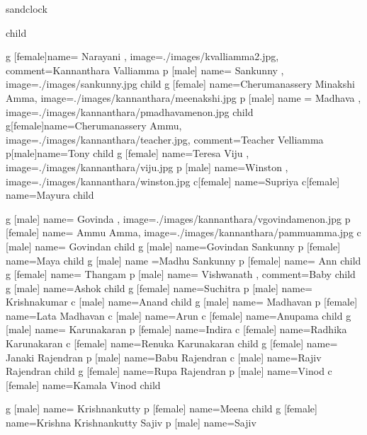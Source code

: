 \documentclass{article}
\begin{document}
\begin{landscape}
\begin{genealogypicture}
sandclock {
	child {
  		g [female]{name={ Narayani }, image={./images/kvalliamma2.jpg}, comment={Kannanthara Valliamma}}
   		p [male] {name={ Sankunny }, image={./images/sankunny.jpg}}
		child {
			g [female] {name={Cherumanassery Minakshi Amma}, image={./images/kannanthara/meenakshi.jpg}}
			p [male] {name ={ Madhava }, image={./images/kannanthara/pmadhavamenon.jpg}}
		}
		child {
  			g[female]{name=Cherumanassery Ammu, image={./images/kannanthara/teacher.jpg}, comment={Teacher Velliamma}}
   			p[male]{name={Tony }}
   			child {
    				g [female] {name=Teresa Viju , image={./images/kannanthara/viju.jpg}}
    				p [male] {name=Winston , image={./images/kannanthara/winston.jpg}}
				c[female] {name={Supriya }}
				c[female] {name={Mayura }}
   			}
  		}
		child {
			g [male] {name={ Govinda }, image={./images/kannanthara/vgovindamenon.jpg}}
			p [female] {name={ Ammu Amma}, image={./images/kannanthara/pammuamma.jpg}}
			c [male] {name={ Govindan }}
			child {
				g [male] {name={Govindan Sankunny}}
				p [female] {name=Maya}
				child {
					g [male] {name ={Madhu Sankunny}}
					p [female] {name={ Ann}}
				}
			}
			child {
				g [female] {name={ Thangam }}
				p [male] {name={ Vishwanath }, comment={Baby}}
				child {
					g [male] {name={Ashok }}
				}
				child {
					g [female] {name={Suchitra }}
					p [male] {name={ Krishnakumar}}
				}
				c [male] {name={Anand }}
			}
			child {
				g [male] {name={ Madhavan}}
				p [female] {name={Lata Madhavan }}
				c [male] {name={Arun }}
				c [female] {name={Anupama }}
			}
			child {
				g [male] {name={ Karunakaran}}
				p [female] {name=Indira}
				c [female] {name={Radhika Karunakaran}}
				c [female] {name={Renuka Karunakaran}}
			}
			child {
				g [female] {name={ Janaki Rajendran}}
				p [male] {name={Babu Rajendran}}
				c [male] {name={Rajiv Rajendran}}
				child {
					g [female] {name={Rupa Rajendran}}
					p [male] {name=Vinod}
					c [female] {name={Kamala Vinod}}
				}
			}
			child {
				g [male] {name={ Krishnankutty}}
				p [female] {name=Meena}
				child {
					g [female] {name={Krishna Krishnankutty Sajiv}}
					p [male] {name=Sajiv}
				}
			
}}}}
\end{genealogypicture}
\end{landscape}
\end{document}

